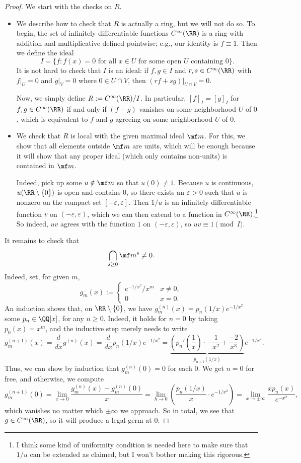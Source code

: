 \begin{proof}
	We start with the checks on $R$.
	\begin{itemize}
		\item We describe how to check that $R$ is actually a ring, but we will not do so. To begin, the set of infinitely differentiable functions $C^\infty(\RR)$ is a ring with addition and multiplicative defined pointwise; e.g., our identity is $f\equiv1$. Then we define the ideal
		\[I=\{f:f(x)=0\text{ for all }x\in U\text{ for some open }U\text{ containing }0\}.\]
		It is not hard to check that $I$ is an ideal: if $f,g\in I$ and $r,s\in C^\infty(\RR)$ with $f|_U=0$ and $g|_V=0$ where $0\in U\cap V$, then $(rf+sg)|_{U\cap V}=0$.

		Now, we simply define $R:=C^\infty(\RR)/I$. In particular, $[f]_I=[g]_I$ for $f,g\in C^\infty(\RR)$ if and only if $(f-g)$ vanishes on some neighborhood $U$ of $0$, which is equivalent to $f$ and $g$ agreeing on some neighborhood $U$ of $0$.

		\item We check that $R$ is local with the given maximal ideal $\mf m$. For this, we show that all elements outside $\mf m$ are units, which will be enough because it will show that any proper ideal (which only contains non-units) is contained in $\mf m$.

		Indeed, pick up some $u\notin\mf m$ so that $u(0)\ne1$. Because $u$ is continuous, $u(\RR\setminus\{0\})$ is open and contains $0$, so there exists an $\varepsilon>0$ such that $u$ is nonzero on the compact set $[-\varepsilon,\varepsilon]$. Then $1/u$ is an infinitely differentiable function $v$ on $(-\varepsilon,\varepsilon)$, which we can then extend to a function in $C^\infty(\RR)$.\footnote{I think some kind of uniformity condition is needed here to make sure that $1/u$ can be extended as claimed, but I won't bother making this rigorous.} So indeed, $uv$ agrees with the function $1$ on $(-\varepsilon,\varepsilon)$, so $uv\equiv1\pmod I$.
	\end{itemize}
	It remains to check that
	\[\bigcap_{s\ge0}\mf m^s\ne0.\]
	Indeed, set, for given $m$,
	\[g_m(x):=\begin{cases}
		e^{-1/x^2}/x^m & x\ne0, \\
		0 & x=0.
	\end{cases}\]
	An induction shows that, on $\RR\setminus\{0\}$, we have $g_m^{(n)}(x)=p_n(1/x)e^{-1/x^2}$ some $p_n\in\QQ[x]$, for any $n\ge0$. Indeed, it holds for $n=0$ by taking $p_0(x)=x^m$, and the inductive step merely needs to write
	\[g_m^{(n+1)}(x)=\frac d{dx}g^{(n)}(x)=\frac d{dx}p_n(1/x)e^{-1/x^2}=\underbrace{\left(p_n'\left(\frac1x\right)\cdot-\frac1{x^2}+\frac{-2}{x^3}\right)}_{p_{n+1}(1/x)}e^{-1/x^2}.\]
	Thus, we can show by induction that $g^{(n)}_m(0)=0$ for each $0$. We get $n=0$ for free, and otherwise, we compute
	\[g_m^{(n+1)}(0)=\lim_{x\to0}\frac{g_m^{(n)}(x)-g_m^{(n)}(0)}x=\lim_{h\to0}\left(\frac{p_n(1/x)}x\cdot e^{-1/x^2}\right)=\lim_{x\to\pm\infty}\frac{xp_n(x)}{e^{-x^2}},\]
	which vanishes no matter which $\pm\infty$ we approach. So in total, we see that $g\in C^\infty(\RR)$, so it will produce a legal germ at $0$.
	

\end{proof}
